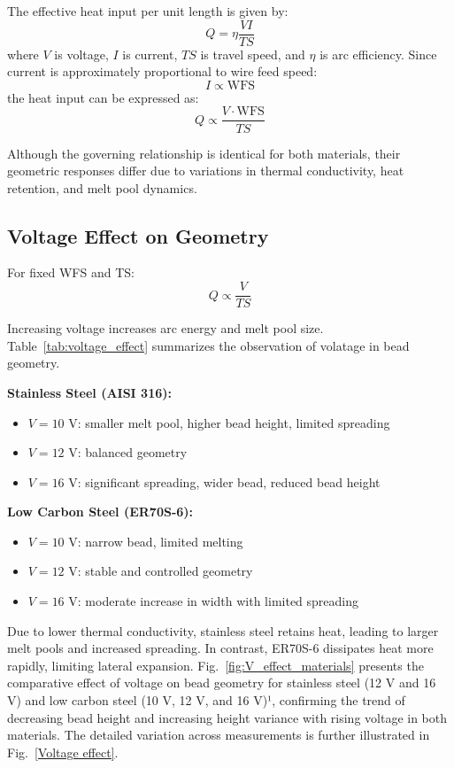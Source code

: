 \documentclass[conference]{IEEEtran}
\begin{document}
The effective heat input per unit length is given by:
\begin{equation}
Q = \eta \frac{V I}{TS}
\end{equation}
where $V$ is voltage, $I$ is current, $TS$ is travel speed, and $\eta$ is arc efficiency. Since current is approximately proportional to wire feed speed:
\begin{equation}
I \propto \mathrm{WFS}
\end{equation}
the heat input can be expressed as:
\begin{equation}
Q \propto \frac{V \cdot \mathrm{WFS}}{TS}
\end{equation}

Although the governing relationship is identical for both materials, their geometric responses differ due to variations in thermal conductivity, heat retention, and melt pool dynamics.

\subsection{Voltage Effect on  Geometry}

For fixed WFS and TS:
\begin{equation}
Q \propto \frac{V}{TS}
\end{equation}

Increasing voltage increases arc energy and melt pool size. Table~\ref{tab:voltage_effect} summarizes the observation of volatage in bead geometry.

\textbf{Stainless Steel (AISI 316):}
\begin{itemize}
    \item $V = 10$ V: smaller melt pool, higher bead height, limited spreading
    \item $V = 12$ V: balanced geometry
    \item $V = 16$ V: significant spreading, wider bead, reduced bead height
\end{itemize}

\textbf{Low Carbon Steel (ER70S-6):}
\begin{itemize}
    \item $V = 10$ V: narrow bead, limited melting
    \item $V = 12$ V: stable and controlled geometry
    \item $V = 16$ V: moderate increase in width with limited spreading
\end{itemize}

Due to lower thermal conductivity, stainless steel retains heat, leading to larger melt pools and increased spreading. In contrast, ER70S-6 dissipates heat more rapidly, limiting lateral expansion. Fig.~\ref{fig:V_effect_materials} presents the comparative effect of voltage on bead geometry for stainless steel (12 V and 16 V) and low carbon steel (10 V, 12 V, and 16 V)¹, confirming the trend of decreasing bead height and increasing height variance with rising voltage in both materials. The detailed variation across measurements is further illustrated in Fig.~\ref{Voltage effect}.
\end{document}
